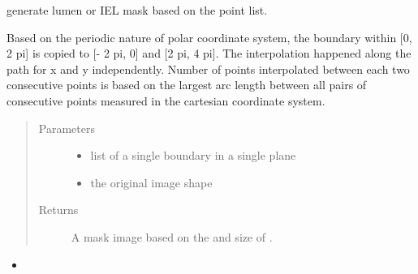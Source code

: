 \documentclass[letterpaper,10pt,english]{sphinxmanual}
\begin{document}
\begin{fulllineitems}
\label{\detokenize{index:util.read_oct_roi_file.boundary_mask}}
generate lumen or IEL mask based on the point list.

Based on the periodic nature of polar coordinate system, the boundary within {[}0, 2 pi{]} is copied to {[}- 2 pi, 0{]} and
{[}2 pi, 4 pi{]}. The interpolation happened along the path for x and y independently. Number of points interpolated
between each two consecutive points is based on the largest arc length between all pairs of consecutive points
measured in the cartesian coordinate system.
\begin{quote}\begin{description}
\item[{Parameters}] \leavevmode\begin{itemize}
\item {} 
 \textendash{} list of a single boundary in a single plane

\item {} 
 \textendash{} the original image shape

\end{itemize}

\item[{Returns}] \leavevmode
A mask image based on the  and size of .

\end{description}\end{quote}



\begin{itemize}
\item {} 
{\hyperref[\detokenize{index:util.read_oct_roi_file.read_oct_roi_file}]{}}

\end{itemize}



\end{fulllineitems}

\end{document}
